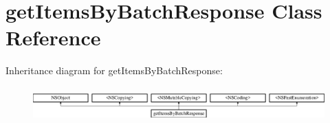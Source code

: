 \hypertarget{interfaceget_items_by_batch_response}{}\section{get\+Items\+By\+Batch\+Response Class Reference}
\label{interfaceget_items_by_batch_response}
Inheritance diagram for get\+Items\+By\+Batch\+Response\+:\begin{figure}[H]
\begin{center}
\leavevmode
\includegraphics[height=1.341317cm]{interfaceget_items_by_batch_response}
\end{center}
\end{figure}
